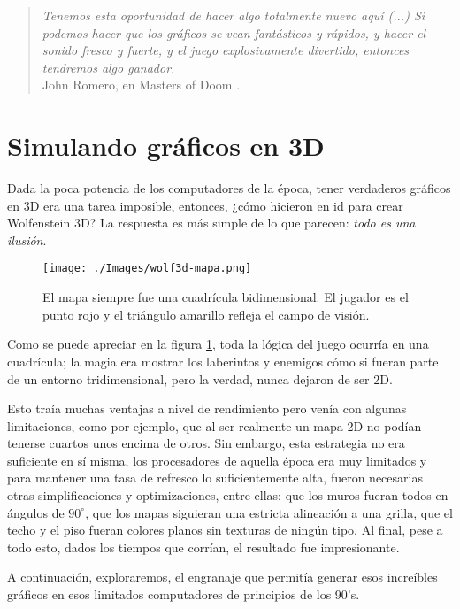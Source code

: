  
 \begin{quote}
 	\emph{Tenemos esta oportunidad de hacer algo totalmente nuevo aquí (...) Si podemos hacer que los gráficos se vean fantásticos y rápidos, y hacer el sonido fresco y fuerte, y el juego explosivamente divertido, entonces tendremos algo ganador.} \\
 	John Romero, en Masters of Doom \cite[p.~92]{doom}.
 \end{quote}

\newpage

\section{Simulando gráficos en 3D}


Dada la poca potencia de los computadores de la época, tener verdaderos gráficos en 3D era una tarea imposible, entonces, ¿cómo hicieron en id para crear Wolfenstein 3D? La respuesta es más simple de lo que parecen: \emph{todo es una ilusión}.

\begin{figure}[h!]
	\centering
	\texttt{[image: ./Images/wolf3d-mapa.png]}
	\caption{El mapa siempre fue una cuadrícula bidimensional. El jugador es el punto rojo y el triángulo amarillo refleja el campo de visión.}
	\label{wolf3d-mapa}
\end{figure}

Como se puede apreciar en la figura \ref{wolf3d-mapa}, toda la lógica del juego ocurría en una cuadrícula; la magia era mostrar los laberintos y enemigos cómo si fueran parte de un entorno tridimensional, pero la verdad, nunca dejaron de ser 2D.

Esto traía muchas ventajas a nivel de rendimiento pero venía con algunas limitaciones, como por ejemplo, que al ser realmente un mapa 2D no podían tenerse cuartos unos encima de otros. Sin embargo, esta estrategia no era suficiente en sí misma, los procesadores de aquella época era muy limitados y para mantener una tasa de refresco lo suficientemente alta, fueron necesarias otras simplificaciones y optimizaciones, entre ellas: que los muros fueran todos en ángulos de $90^{\circ}$, que los mapas siguieran una estricta alineación a una grilla, que el techo y el piso fueran colores planos sin texturas de ningún tipo. Al final, pese a todo esto, dados los tiempos que corrían, el resultado fue impresionante. 

A continuación, exploraremos, el engranaje que permitía generar esos increíbles gráficos en esos limitados computadores de principios de los 90's.

